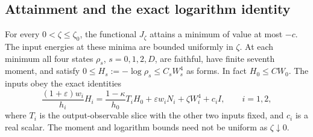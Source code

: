 \subsection{Attainment and the exact logarithm identity}

\begin{proposition}\label{prop:regularized-minimum}
For every $0<\zeta\le\zeta_0$, the functional $J_\zeta$ attains a
minimum of value at most $-c$. The input energies at these minima are
bounded uniformly in $\zeta$. At each minimum all four states
$\rho_s$, $s=0,1,2,D$, are faithful, have finite seventh moment, and
satisfy $0\le H_s:=-\log\rho_s\le C_sW_s^4$ as forms. In fact
$H_0\le CW_0$. The inputs obey the exact identities
\begin{equation}\label{eq:log-identity}
 \frac{(1+\varepsilon)w_i}{h_i}H_i
 =\frac{1-\kappa}{h_0}T_iH_0
   +\varepsilon w_iN_i+\zeta W_i^4+c_iI,
 \qquad i=1,2,
\end{equation}
where $T_i$ is the output-observable slice with the other two inputs
fixed, and $c_i$ is a real scalar. The moment and logarithm bounds need
not be uniform as $\zeta\downarrow0$.
\end{proposition}

